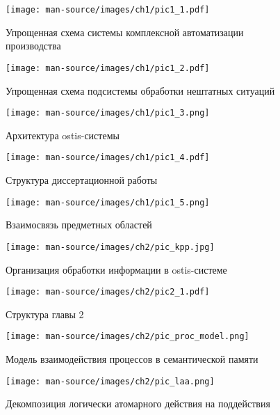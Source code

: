 \documentclass{thesisby}
\begin{document}
\begin{figure}[H]
  \center
  \texttt{[image: man-source/images/ch1/pic1\_1.pdf]}
  \caption{Упрощенная схема системы комплексной автоматизации производства} 
    \label{fig:pic1_1}
\end{figure}


\begin{figure}[H]
  \center
  \texttt{[image: man-source/images/ch1/pic1\_2.pdf]}
  \caption{Упрощенная схема подсистемы обработки нештатных ситуаций} 
    \label{fig:pic1_2}
\end{figure}


\begin{figure}[H]
  \center
  \texttt{[image: man-source/images/ch1/pic1\_3.png]}
  \caption{Архитектура ostis-системы} 
    \label{fig:pic1_3}
\end{figure}


\begin{figure}[H]
  \centering
  \texttt{[image: man-source/images/ch1/pic1\_4.pdf]}
  \caption{Структура диссертационной работы}
  \label{fig:pic1_4}
\end{figure}


\begin{figure}[H]
  \centering
  \texttt{[image: man-source/images/ch1/pic1\_5.png]}
  \caption{Взаимосвязь предметных областей}
  \label{fig:pic1_5}
\end{figure}


\begin{figure}[H]
  \centering
  \texttt{[image: man-source/images/ch2/pic\_kpp.jpg]}
  \caption{Организация обработки информации в ostis-системе}
  \label{fig:pic_kpp}
\end{figure}


\begin{figure}[H]
  \centering
  \texttt{[image: man-source/images/ch2/pic2\_1.pdf]}
  \caption{Структура главы 2}
  \label{fig:pic2_1}
\end{figure}


\begin{figure}[H]
  \centering
  \texttt{[image: man-source/images/ch2/pic\_proc\_model.png]}
  \caption{Модель взаимодействия процессов в семантической памяти}
  \label{fig:pic_proc_model}
\end{figure}


\begin{figure}[H]
  \centering
  \texttt{[image: man-source/images/ch2/pic\_laa.png]}
  \caption{Декомпозиция логически атомарного действия на поддействия}
  \label{fig:pic_laa}
\end{figure}
\end{document}
